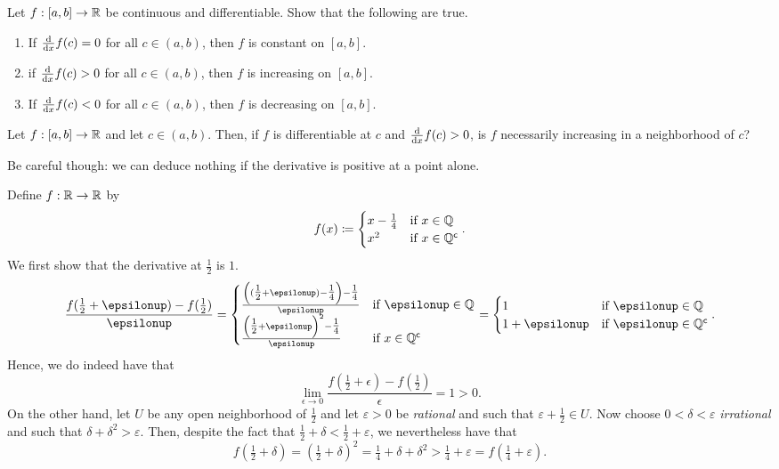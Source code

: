 \begin{exr}
Let $f:[a,b]\rightarrow \mathbb{R}$ be continuous and differentiable.  Show that the following are true.
\begin{enumerate}
\item If $\frac{\mathop{}\!\mathrm{d}}{\mathop{}\!\mathrm{d} x}f(c)=0$ for all $c\in (a,b)$, then $f$ is constant on $[a,b]$.
\item if $\frac{\mathop{}\!\mathrm{d}}{\mathop{}\!\mathrm{d} x}f(c)>0$ for all $c\in (a,b)$, then $f$ is increasing on $[a,b]$.
\item If $\frac{\mathop{}\!\mathrm{d}}{\mathop{}\!\mathrm{d} x}f(c)<0$ for all $c\in (a,b)$, then $f$ is decreasing on $[a,b]$.
\end{enumerate}
\end{exr}
\begin{exr}
Let $f:[a,b]\rightarrow \mathbb{R}$ and let $c\in (a,b)$.  Then, if $f$ is differentiable at $c$ and $\frac{\mathop{}\!\mathrm{d}}{\mathop{}\!\mathrm{d} x}f(c)>0$, is $f$ necessarily increasing in a neighborhood of $c$?
\end{exr}
Be careful though:  we can deduce nothing if the derivative is positive at a point alone.
\begin{exm}
Define $f:\mathbb{R} \rightarrow \mathbb{R}$ by
\begin{equation}
f(x)\coloneqq \begin{cases}x-\tfrac{1}{4} & \text{if }x\in \mathbb{Q} \\ x^2 & \text{if }x\in \mathbb{Q} ^{\mathsf{c}}\end{cases}.
\end{equation}
We first show that the derivative at $\frac{1}{2}$ is $1$.
\begin{equation}
\frac{f(\tfrac{1}{2}+\epsilon )-f(\tfrac{1}{2})}{\epsilon}=\begin{cases}\frac{\left( (\tfrac{1}{2}+\epsilon )-\tfrac{1}{4}\right) -\tfrac{1}{4}}{\epsilon} & \text{if }\epsilon \in \Q \\ \frac{\left( \tfrac{1}{2}+\epsilon \right) ^2-\tfrac{1}{4}}{\epsilon} & \text{if }x\in \Q ^{\comp}\end{cases}=\begin{cases}1 & \text{if }\epsilon \in \Q \\ 1+\epsilon & \text{if }\epsilon \in \Q ^{\comp}\end{cases}.
\end{equation}
Hence, we do indeed have that
\begin{equation}
\lim _{\epsilon \to 0}\frac{f(\tfrac{1}{2}+\epsilon )-f(\tfrac{1}{2})}{\epsilon}=1>0.
\end{equation}
On the other hand, let $U$ be any open neighborhood of $\frac{1}{2}$ and let $\varepsilon >0$ be \emph{rational} and such that $\varepsilon +\frac{1}{2}\in U$.  Now choose $0<\delta <\varepsilon$ \emph{irrational} and such that $\delta +\delta ^2>\varepsilon$.  Then, despite the fact that $\frac{1}{2}+\delta <\frac{1}{2}+\varepsilon$, we nevertheless have that
\begin{equation}
f(\tfrac{1}{2}+\delta )=(\tfrac{1}{2}+\delta )^2=\tfrac{1}{4}+\delta +\delta ^2>\tfrac{1}{4}+\varepsilon =f(\tfrac{1}{4}+\varepsilon ).
\end{equation}
\end{exm}

